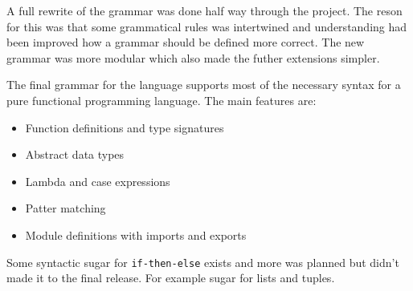 A full rewrite of the grammar was done half way through the project. The reson for this was that some grammatical rules was intertwined and understanding had been improved how a grammar should be defined more correct. The new grammar was more modular which also made the futher extensions simpler.

The final grammar for the language supports most of the necessary syntax for a pure functional programming language. The main features are:

\begin{itemize}
  \item Function definitions and type signatures
  \item Abstract data types
  \item Lambda and case expressions
  \item Patter matching
  \item Module definitions with imports and exports
\end{itemize}


Some syntactic sugar for \texttt{if-then-else} exists and more was planned but didn't made it to the final release. For example sugar for lists and tuples.


